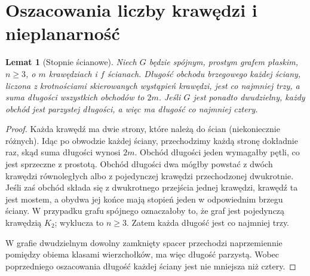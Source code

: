 \documentclass[11pt,a4paper]{report}
\numberwithin{equation}{section}
\theoremstyle{plain}
\newtheorem{lemat}[twierdzenie]{Lemat}
\theoremstyle{definition}
\theoremstyle{remark}
\begin{document}
\begin{center}
\end{center}

\section{Oszacowania liczby krawędzi i nieplanarność}
\label{sec:tg-planarne-granice}

\begin{lemat}[Stopnie ścianowe]
Niech $G$ będzie spójnym, prostym grafem płaskim,
$n\ge3$, o $m$ krawędziach i $f$ ścianach.
Długość obchodu brzegowego każdej ściany, liczona
z krotnościami skierowanych wystąpień krawędzi, jest
co najmniej trzy, a suma długości wszystkich obchodów
to $2m$. Jeśli $G$ jest ponadto dwudzielny, każdy
obchód jest parzystej długości, a więc ma długość co najmniej cztery.
\end{lemat}

\begin{proof}
Każda krawędź ma dwie strony, które należą do ścian
(niekoniecznie różnych). Idąc po obwodzie każdej ściany,
przechodzimy każdą stronę dokładnie raz, skąd suma długości
wynosi $2m$. Obchód długości jeden wymagałby pętli, co jest
sprzeczne z prostotą. Obchód długości dwa mógłby powstać
z dwóch krawędzi równoległych albo z pojedynczej krawędzi
przechodzonej dwukrotnie. Jeśli zaś obchód składa się z dwukrotnego przejścia
jednej krawędzi, krawędź ta jest mostem, a obydwa jej końce
mają stopień jeden w odpowiednim brzegu ściany.
W przypadku grafu spójnego oznaczałoby to, że graf jest
pojedynczą krawędzią $K_2$; wyklucza to $n\ge3$.
Zatem każda długość jest co najmniej trzy.

W grafie dwudzielnym dowolny zamknięty spacer przechodzi
naprzemiennie pomiędzy obiema klasami wierzchołków,
ma więc długość parzystą. Wobec poprzedniego oszacowania
długość każdej ściany jest nie mniejsza niż cztery.
\end{proof}
\end{document}
